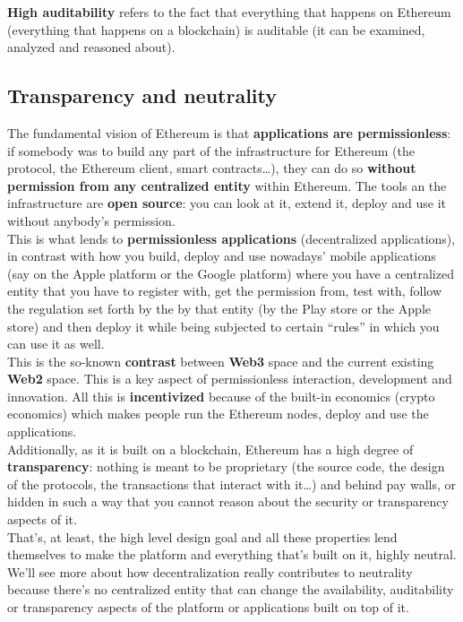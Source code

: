 \textbf{High auditability} refers to the fact that everything that happens on Ethereum (everything that happens on a blockchain) is auditable (it can be examined, analyzed and reasoned about).

\subsection*{Transparency and neutrality}

The fundamental vision of Ethereum is that \textbf{applications are permissionless}: if somebody was to build any part of the infrastructure for Ethereum (the protocol, the Ethereum client, smart contracts\dots), they can do so \textbf{without permission from any centralized entity} within Ethereum.
The tools an the infrastructure are \textbf{open source}: you can look at it, extend it, deploy and use it without anybody's permission.\\

This is what lends to \textbf{permissionless applications} (decentralized applications), in contrast with how you build, deploy and use nowadays' mobile applications (say on the Apple platform or the Google platform) where you have a centralized entity that you have to register with, get the permission from, test with, follow the regulation set forth by the by that entity (by the Play store or the Apple store) and then deploy it while being subjected to certain ``rules'' in which you can use it as well.\\

This is the so-known \textbf{contrast} between \textbf{Web3} space and the current existing \textbf{Web2} space.
This is a key aspect of permissionless interaction, development and innovation.
All this is \textbf{incentivized} because of the built-in economics (crypto economics) which makes people run the Ethereum nodes, deploy and use the applications.\\

Additionally, as it is built on a blockchain, Ethereum has a high degree of \textbf{transparency}: nothing is meant to be proprietary (the source code, the design of the protocols, the transactions that interact with it\dots) and behind pay walls, or hidden in such a way that you cannot reason about the security or transparency aspects of it.\\

That's, at least, the high level design goal and all these properties lend themselves to make the platform and everything that's built on it, highly neutral.
We'll see more about how decentralization really contributes to neutrality because there's no centralized entity that can change the availability, auditability or transparency aspects of the platform or applications built on top of it.

